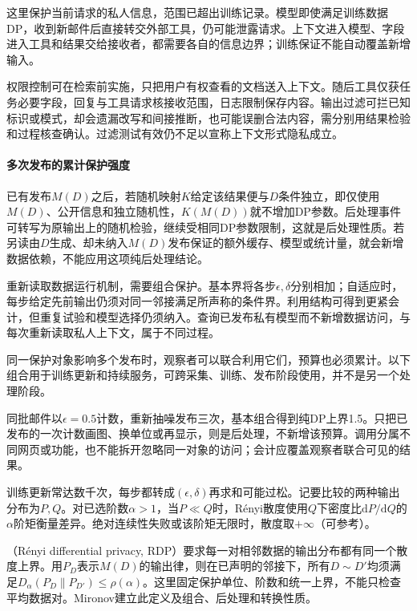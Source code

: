 这里保护当前请求的私人信息，范围已超出训练记录。模型即使满足训练数据DP，收到新邮件后直接转交外部工具，仍可能泄露请求。上下文进入模型、字段进入工具和结果交给接收者，都需要各自的信息边界；训练保证不能自动覆盖新增输入。

权限控制可在检索前实施，只把用户有权查看的文档送入上下文。随后工具仅获任务必要字段，回复与工具请求核接收范围，日志限制保存内容。输出过滤可拦已知标识或模式，却会遗漏改写和间接推断，也可能误删合法内容，需分别用结果检验和过程核查确认。过滤测试有效仍不足以宣称上下文形式隐私成立。

\paragraph{多次发布的累计保护强度}
\label{sec:privacy-repeated-use}

已有发布$M(D)$之后，若随机映射$K$给定该结果便与$D$条件独立，即仅使用$M(D)$、公开信息和独立随机性，$K(M(D))$就不增加DP参数。后处理事件可转写为原输出上的随机检验，继续受相同DP参数限制，这就是后处理性质。若另读由$D$生成、却未纳入$M(D)$发布保证的额外缓存、模型或统计量，就会新增数据依赖，不能应用这项纯后处理结论。

重新读取数据运行机制，需要组合保护。基本界将各步$\epsilon,\delta$分别相加；自适应时，每步给定先前输出仍须对同一邻接满足所声称的条件界。利用结构可得到更紧会计，但重复试验和模型选择仍须纳入。查询已发布私有模型而不新增数据访问，与每次重新读取私人上下文，属于不同过程。

同一保护对象影响多个发布时，观察者可以联合利用它们，预算也必须累计。以下组合用于训练更新和持续服务，可跨采集、训练、发布阶段使用，并不是另一个处理阶段。

同批邮件以$\epsilon=0.5$计数，重新抽噪发布三次，基本组合得到纯DP上界1.5。只把已发布的一次计数画图、换单位或再显示，则是后处理，不新增该预算。调用分属不同网页或功能，也不能拆开忽略同一对象的访问；会计应覆盖观察者联合可见的结果。

训练更新常达数千次，每步都转成$(\epsilon,\delta)$再求和可能过松。记要比较的两种输出分布为$P,Q$。对已选阶数$\alpha>1$，当$P\ll Q$时，Rényi散度使用$Q$下密度比$\mathrm dP/\mathrm dQ$的$\alpha$阶矩衡量差异。绝对连续性失败或该阶矩无限时，散度取$+\infty$（可参考）。

（Rényi differential privacy, RDP）要求每一对相邻数据的输出分布都有同一个散度上界。用$P_D$表示$M(D)$的输出律，则在已声明的邻接下，所有$D\sim D'$均须满足$D_\alpha(P_D\|P_{D'})\leq\rho(\alpha)$。这里固定保护单位、阶数和统一上界，不能只检查平均数据对。Mironov建立此定义及组合、后处理和转换性质。

